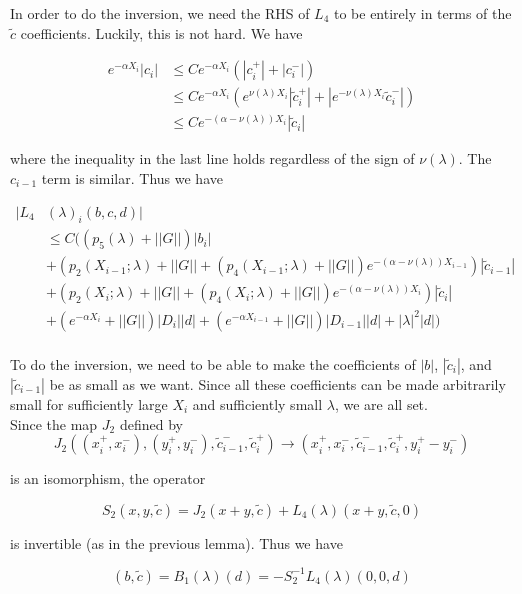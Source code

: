\documentclass[12pt]{article}
\begin{document}
In order to do the inversion, we need the RHS of $L_4$ to be entirely in terms of the $\tilde{c}$ coefficients. Luckily, this is not hard. We have

\begin{align*}
e^{-\alpha X_i} |c_i| &\leq C e^{-\alpha X_i} ( |c_i^+| + |c_i^-| ) \\
&\leq C e^{-\alpha X_i} ( e^{\nu(\lambda)X_i } |\tilde{c}_i^+| 
+ | e^{-\nu(\lambda)X_i }\tilde{c}_i^-| )\\
&\leq C e^{-(\alpha - \nu(\lambda)) X_i} |\tilde{c}_i|
\end{align*}

where the inequality in the last line holds regardless of the sign of $\nu(\lambda)$. The $c_{i-1}$ term is similar. Thus we have

\begin{align*}
|L_4&(\lambda)_i(b, c, d)|\\ 
&\leq C \Big( (p_5(\lambda) + ||G||) |b_i| \\
&+ (p_2(X_{i-1}; \lambda) + ||G|| + ( p_4(X_{i-1}; \lambda) + ||G|| )e^{-(\alpha - \nu(\lambda)) X_{i-1}} ) |\tilde{c}_{i-1}| \\
&+ (p_2(X_i; \lambda) + ||G|| + ( p_4(X_i; \lambda) + ||G|| )e^{-(\alpha - \nu(\lambda)) X_i })|\tilde{c}_i| \\
&+ (e^{-\alpha X_i} + ||G||) |D_i||d| + (e^{-\alpha X_{i-1}} + ||G||) |D_{i-1}||d| +|\lambda|^2|d|
\Big)\\
\end{align*}


To do the inversion, we need to be able to make the coefficients of $|b|$, $|\tilde{c}_i|$, and $|\tilde{c}_{i-1}|$ be as small as we want. Since all these coefficients can be made arbitrarily small for sufficiently large $X_i$ and sufficiently small $\lambda$, we are all set. \\

Since the map $J_2$ defined by
\[
J_2( (x_i^+, x_i^-),(y_i^+, y_i^-), \tilde{c}_{i-1}^-, \tilde{c}_i^+ ) \rightarrow ( x_i^+, x_i^-, \tilde{c}_{i-1}^-, \tilde{c}_i^+, y_i^+ -  y_i^- )
\]

is an isomorphism, the operator

\[
S_2(x,y, \tilde{c}) = J_2(x+y, \tilde{c}) + L_4(\lambda)(x+y,\tilde{c}, 0)
\]

is invertible (as in the previous lemma). Thus we have

\begin{equation}
(b,\tilde{c}) = B_1(\lambda)(d) = -S_2^{-1} L_4(\lambda)(0, 0, d)
\end{equation}
\end{document}
